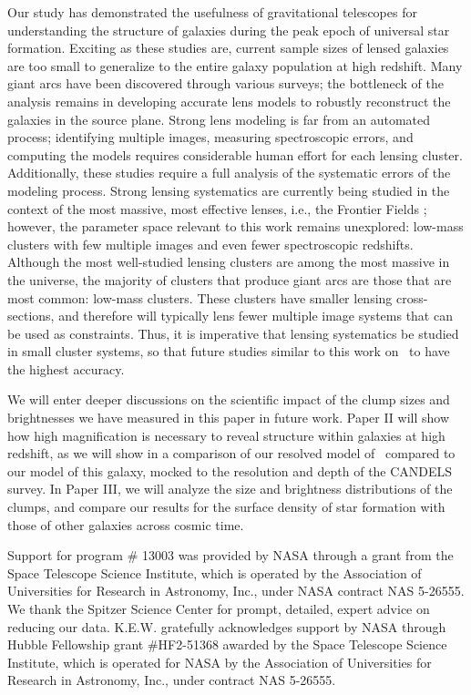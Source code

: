 Our study has demonstrated the usefulness of gravitational telescopes for understanding the structure of galaxies during the peak epoch of universal star formation. Exciting as these studies are, current sample sizes of lensed galaxies are too small to generalize to the entire galaxy population at high redshift. Many giant arcs have been discovered through various surveys; the bottleneck of the analysis remains in developing accurate lens models to robustly reconstruct the galaxies in the source plane. Strong lens modeling is far from an automated process; identifying multiple images, measuring spectroscopic errors, and computing the models requires considerable human effort for each lensing cluster. Additionally, these studies require a full analysis of the systematic errors of the modeling process. Strong lensing systematics are currently being studied in the context of the most massive, most effective lenses, i.e., the Frontier Fields \citep[see][]{Meneghetti:2016xe,Johnson:2016rt}; however, the parameter space relevant to this work remains unexplored: low-mass clusters with few multiple images and even fewer spectroscopic redshifts. Although the most well-studied lensing clusters are among the most massive in the universe, the majority of clusters that produce giant arcs are those that are most common: low-mass clusters. These clusters have smaller lensing cross-sections, and therefore will typically lens fewer multiple image systems that can be used as constraints. Thus, it is imperative that lensing systematics be studied in small cluster systems, so that future studies similar to this work on \giantarc\ to have the highest accuracy.

We will enter deeper discussions on the scientific impact of the clump sizes and brightnesses we have measured in this paper in future work. Paper II will show how high magnification is necessary to reveal structure within galaxies at high redshift, as we will show in a comparison of our resolved model of \giantarc\ compared to our model of this galaxy, mocked to the resolution and depth of the CANDELS survey. In Paper III, we will analyze the size and brightness distributions of the clumps, and compare our results for the surface density of star formation with those of other galaxies across cosmic time.

\vspace{24pt}
Support for program \# 13003 was provided by NASA through a grant from the Space Telescope Science Institute, which is operated by the Association of Universities for Research in Astronomy, Inc., under NASA contract NAS 5-26555. We thank the Spitzer Science Center for prompt, detailed, expert advice on reducing our data. K.E.W. gratefully acknowledges support by NASA through Hubble Fellowship grant \#HF2-51368 awarded by the Space Telescope Science Institute, which is operated for NASA by the Association of Universities for Research in Astronomy, Inc., under contract NAS 5-26555.
